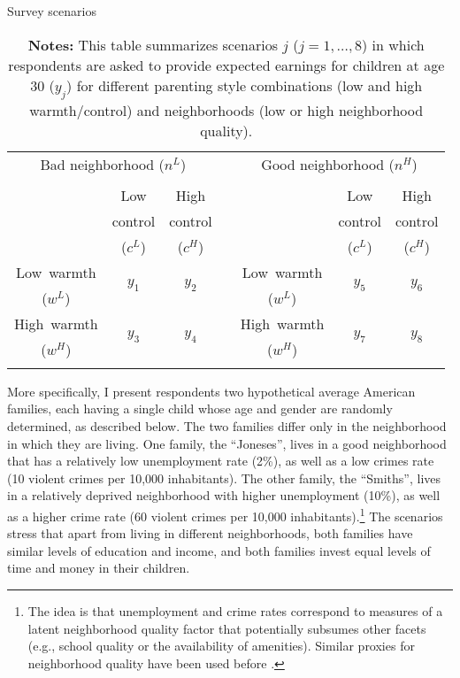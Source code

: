\documentclass[12pt, a4paper, english]{article}
\begin{document}
\begin{table}[h!]\centering
\caption{Survey scenarios}\label{tab:scenarios}
\begin{tabular}{c|c|c p{0.5cm} c|c|c}
\multicolumn{3}{c}{Bad neighborhood ($n^L$)} & & \multicolumn{3}{c}{Good neighborhood ($n^H$)} \\
\multicolumn{7}{c}{ }\\
                        & Low               & High          & &                         & Low               & High              \\
                        & control   & control & &                       & control   & control   \\
                        & ($c^L$)   & ($c^H$) & &                       & ($c^L$)   & ($c^H$) \\\cline{1-3}\cline{5-7}
Low \,warmth    & \multirow{2}{*}{$y_1$}             & \multirow{2}{*}{$y_2$}         & & Low \,warmth  & \multirow{2}{*}{$y_5$}             &\multirow{2}{*}{ $y_6$}             \\
 ($w^L$)        &              &               & & ($w^L$)  &              &              \\\cline{1-3}\cline{5-7}
High \,warmth   & \multirow{2}{*}{$y_3$}             & \multirow{2}{*}{$y_4$}         & & High \,warmth & \multirow{2}{*}{$y_7$}             & \multirow{2}{*}{$y_8$}             \\
 ($w^H$)        &              &         & & ($w^H$) &              &              \\
\multicolumn{7}{c}{ }\\
\end{tabular}
\vspace{0.5em}
\caption*{\footnotesize \textbf{Notes:} This table summarizes scenarios $j$ ($j=1,\ldots,8$) in which respondents are asked to provide expected earnings for children at age 30 ($y_j$) for different parenting style combinations (low and high warmth/control) and neighborhoods (low or high neighborhood quality).}
\end{table}

More specifically, I present respondents two hypothetical average American families, each having a single child whose age and gender are randomly determined, as described below. The two families differ only in the neighborhood in which they are living. One family, the ``Joneses'', lives in a good neighborhood that has a relatively low unemployment rate (2\%), as well as a low crimes rate (10 violent crimes per 10,000 inhabitants). The other family, the ``Smiths'', lives in a relatively deprived neighborhood with higher unemployment (10\%), as well as a higher crime rate (60 violent crimes per 10,000 inhabitants).\footnote{The idea is that unemployment and crime rates correspond to measures of a latent neighborhood quality factor that potentially subsumes other facets (e.g., school quality or the availability of amenities). Similar proxies for neighborhood quality have been used before \citep[e.g.,][]{Han2019}.} The scenarios stress that apart from living in different neighborhoods, both families have similar levels of education and income, and both families invest equal levels of time and money in their children. 
\end{document}
